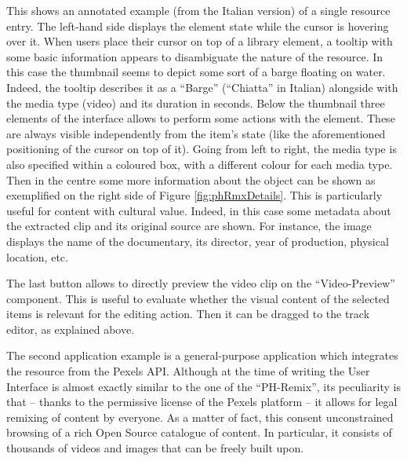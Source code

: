 This shows an annotated example (from the Italian version) of a single resource entry. The left-hand side displays the element state while the cursor is hovering over it. When users place their cursor on top of a library element, a tooltip with some basic information appears to disambiguate the nature of the resource. In this case the thumbnail seems to depict some sort of a barge floating on water. Indeed, the tooltip describes it as a “Barge” (“Chiatta” in Italian) alongside with the media type (video) and its duration in seconds. Below the thumbnail three elements of the interface allows to perform some actions with the element. These are always visible independently from the item’s state (like the aforementioned positioning of the cursor on top of it). Going from left to right, the media type is also specified within a coloured box, with a different colour for each media type. Then in the centre some more information about the object can be shown as exemplified on the right side of Figure \ref{fig:phRmxDetails}. This is particularly useful for content with cultural value. Indeed, in this case some metadata about the extracted clip and its original source are shown. For instance, the image displays the name of the documentary, its director, year of production, physical location, etc.

The last button allows to directly preview the video clip on the “Video-Preview” component. This is useful to evaluate whether the visual content of the selected items is relevant for the editing action. Then it can be dragged to the track editor, as explained above.

The second application example is a general-purpose application which integrates the resource from the Pexels API. Although at the time of writing the User Interface is almost exactly similar to the one of the “PH-Remix”, its peculiarity is that – thanks to the permissive license of the Pexels platform – it allows for legal remixing of content by everyone.
As a matter of fact, this consent unconstrained browsing of a rich Open Source catalogue of content. In particular, it consists of thousands of videos and images that can be freely built upon. 

